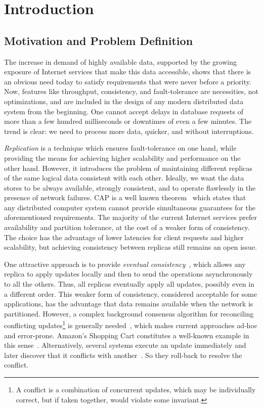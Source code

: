\chapter{Introduction}

\section{Motivation and Problem Definition}
\label{sec:motivation_and_problem_definition}

The increase in demand of highly available data, supported by the growing
exposure of Internet services that make this data accessible, shows that there
is an obvious need today to satisfy requirements that were never before a priority.
Now, features like throughput, consistency, and fault-tolerance are necessities,
not optimizations, and are included in the design of any modern distributed data
system from the beginning. One cannot accept delays in database requests of more
than a few hundred milliseconds or downtimes of even a few minutes. The trend is
clear: we need to process more data, quicker, and without interruptions.

\textit{Replication} is a technique which ensures fault-tolerance on one hand,
while providing the means for achieving higher scalability and performance on the
other hand. However, it introduces the problem of maintaining different replicas
of the same logical data consistent with each other. Ideally, we want the data
stores to be always available, strongly consistent, and to operate flawlessly in
the presence of network failures. CAP is a well known
theorem~\cite{Gilbert:2002:BCF:564585.564601} which states that any distributed
computer system cannot provide simultaneous guarantees for the aforementioned
requirements. The majority of the current Internet services prefer availability
and partition tolerance, at the cost of a weaker form of consistency. The choice
has the advantage of lower latencies for client requests and higher scalability,
but achieving consistency between replicas still remains an open issue.

One attractive approach is to provide \textit{eventual
consistency}~\cite{DBLP:journals/queue/Vogels08a,
Saito:2005:OR:1057977.1057980}, which allows any replica to apply updates
locally and then to send the operations asynchronously to all the others. Thus,
all replicas eventually apply all updates, possibly even in a different order.
This weaker form of consistency, considered acceptable for some applications,
has the advantage that data remains available when the network is partitioned.
However, a complex background consensus algorithm for reconciling conflicting
updates\footnote{A conflict is a combination of concurrent updates, which may be
individually correct, but if taken together, would violate some invariant.} is
generally needed~\cite{Terry:1995:MUC:224056.224070}, which makes current
approaches ad-hoc and error-prone. Amazon's Shopping Cart constitutes a
well-known example in this sense~\cite{DeCandia:2007:DAH:1294261.1294281}.
Alternatively, several systems execute an update immediately and later discover
that it conflicts with another~\cite{Terry:1995:MUC:224056.224070}. So they
roll-back to resolve the conflict.

